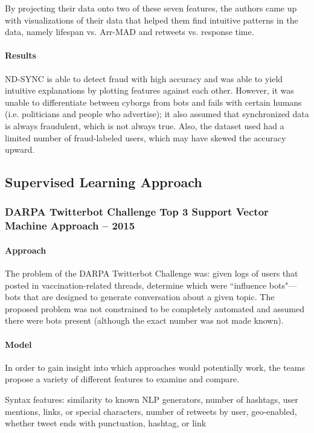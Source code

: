 \documentclass[11pt, oneside]{article}   	%
\begin{document}
\quad By projecting their data onto two of these seven features, the authors came up with visualizations of their data that helped them find intuitive patterns in the data, namely lifespan vs. Arr-MAD and retweets vs. response time.

\paragraph{Results}
\quad

\quad ND-SYNC is able to detect fraud with high accuracy and was able to yield intuitive explanations by plotting features against each other.
However, it was unable to differentiate between cyborgs from bots and fails with certain humans (i.e. politicians and people who advertise); it also assumed that synchronized data is always fraudulent, which is not always true.
Also, the dataset used had a limited number of fraud-labeled users, which may have skewed the accuracy upward.

\subsection{Supervised Learning Approach}
\subsubsection{DARPA Twitterbot Challenge Top 3 Support Vector Machine Approach -- 2015}

\paragraph{Approach}
\quad

\quad The problem of the DARPA Twitterbot Challenge was: given logs of users that posted in vaccination-related threads, determine which were ``influence bots"---bots that are designed to generate conversation about a given topic.
The proposed problem was not constrained to be completely automated and assumed there were bots present (although the exact number was not made known).

\paragraph{Model}
\quad

\quad In order to gain insight into which approaches would potentially work, the teams propose a variety of different features to examine and compare.

Syntax features: similarity to known NLP generators, number of hashtags, user mentions, links, or special characters, number of retweets by user, geo-enabled, whether tweet ends with punctuation, hashtag, or link
\end{document}
